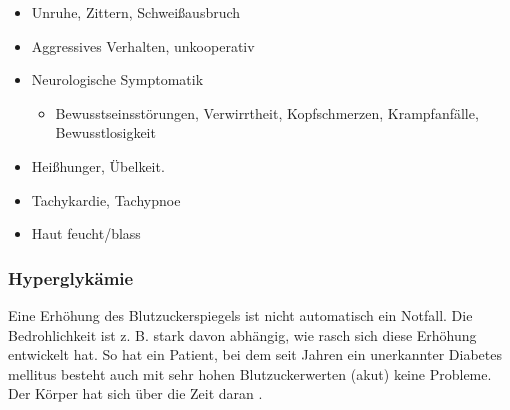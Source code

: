 {{

}{
\begin{itemize}
  \item Unruhe, Zittern, Schweißausbruch
  \item Aggressives Verhalten, unkooperativ
  \item Neurologische Symptomatik
  \begin{itemize}
    \item Bewusstseinsstörungen, Verwirrtheit, Kopfschmerzen, Krampfanfälle,
    Bewusstlosigkeit
  \end{itemize}
  \item Heißhunger, Übelkeit.
  \item Tachykardie, Tachypnoe
  \item Haut feucht/blass
\end{itemize}
}{}{}{}












%   
%   
%   


\subsubsection{Hyperglykämie}
\label{topic:hyperglykaemie}




{%
Eine Erhöhung des Blutzuckerspiegels ist nicht automatisch
ein Notfall. Die Bedrohlichkeit ist z. B. stark davon
abhängig, wie rasch sich diese Erhöhung entwickelt hat. So
hat ein Patient, bei dem seit Jahren ein unerkannter
Diabetes mellitus besteht auch mit sehr hohen
Blutzuckerwerten (akut) keine Probleme. Der Körper hat sich
über die Zeit daran .

}}
